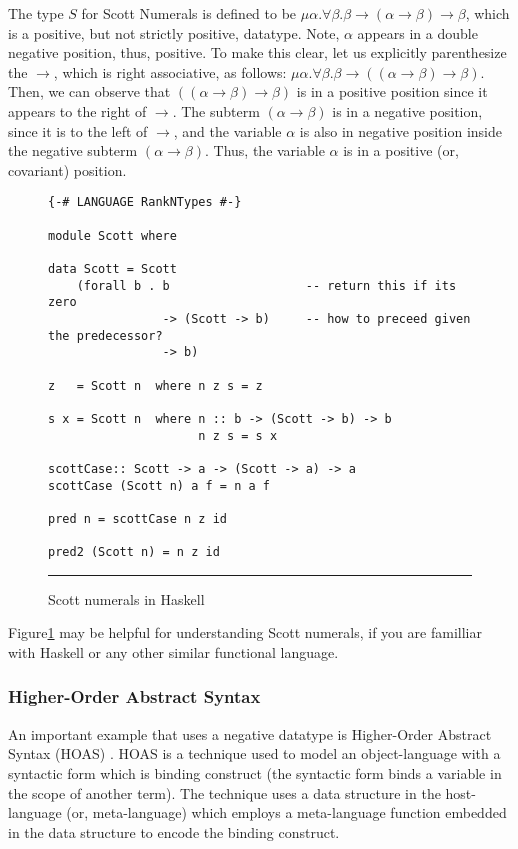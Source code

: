 The type $S$ for Scott Numerals is defined to be
$\mu\alpha.\forall\beta.\beta\to(\alpha\to\beta)\to\beta$,
which is a positive, but not strictly positive, datatype.
Note, $\alpha$ appears in a double negative position, thus, positive.
To make this clear, let us explicitly parenthesize the $\to$,
which is right associative, as follows:
$\mu\alpha.\forall\beta.\beta\to((\alpha\to\beta)\to\beta)$.
Then, we can observe that $((\alpha\to\beta)\to\beta)$ is in a positive position
since it appears to the right of $\to$. The subterm $(\alpha\to\beta)$ is in
a negative position, since it is to the left of $\to$, and the variable $\alpha$
is also in negative position inside the negative subterm $(\alpha\to\beta)$.
Thus, the variable $\alpha$ is in a positive (or, covariant) position.

\begin{figure}
\begin{verbatim}
{-# LANGUAGE RankNTypes #-}

module Scott where

data Scott = Scott 
    (forall b . b                   -- return this if its zero
                -> (Scott -> b)     -- how to preceed given the predecessor?
                -> b)

z   = Scott n  where n z s = z
  
s x = Scott n  where n :: b -> (Scott -> b) -> b
                     n z s = s x

scottCase:: Scott -> a -> (Scott -> a) -> a
scottCase (Scott n) a f = n a f

pred n = scottCase n z id

pred2 (Scott n) = n z id
\end{verbatim}
\caption{Scott numerals in Haskell}\vspace*{.5em}\hrule
\label{fig:ScottNum}
\end{figure}

Figure\;\ref{fig:ScottNum} may be helpful for understanding Scott numerals,
if you are familliar with Haskell or any other similar functional language.

\subsubsection{Higher-Order Abstract Syntax} \label{sssec:HOAS}
An important example that uses a negative datatype is
Higher-Order Abstract Syntax (HOAS) \cite{Church40,MilNad87,PfeEll88}.
HOAS is a technique used to model an object-language with a syntactic
form which is binding construct (the syntactic form binds a variable
in the scope of another term). The technique uses a data structure in
the host-language (or, meta-language) which employs a meta-language function
embedded in the data structure to encode the binding construct.

